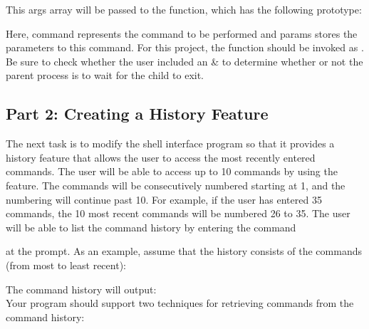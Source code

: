 This args array will be passed to the  function, which has the following prototype:
\begin{flushleft}
\end{flushleft}

Here, command represents the command to be performed and params stores the parameters to this command. For this project, the  function should be invoked as . Be sure to check whether the user included an \& to determine whether or not the parent process is to wait for the child to exit.

\subsection*{Part 2: Creating a History Feature}
The next task is to modify the shell interface program so that it provides a history feature that allows the user to access the most recently entered commands. The user will be able to access up to 10 commands by using the feature. The commands will be consecutively numbered starting at 1, and the numbering will continue past 10. For example, if the user has entered 35 commands, the 10 most recent commands will be numbered 26 to 35.
The user will be able to list the command history by entering the command
\begin{flushleft}
\end{flushleft}
at the  prompt. As an example, assume that the history consists of the commands (from most to least recent):
\begin{flushleft}
\end{flushleft}
The command history will output:\\
Your program should support two techniques for retrieving commands from the command history:
